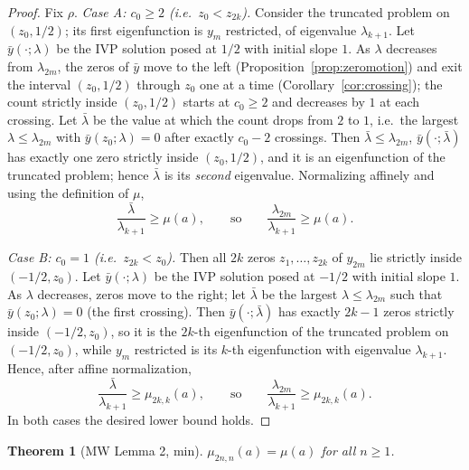 ﻿\documentclass[11pt]{article}
\newtheorem{theorem}{Theorem}[section]
\begin{document}
\begin{proof}
	Fix $\rho$.
	\emph{Case A: $c_0\ge 2$ (i.e.\ $z_0<z_{2k}$).}
	Consider the truncated problem on $(z_0,1/2)$; its first eigenfunction
	is $y_m$ restricted, of eigenvalue $\lambda_{k+1}$.  Let
	$\bar y(\cdot;\lambda)$ be the IVP solution posed at $1/2$ with initial
	slope $1$.  As $\lambda$ decreases from $\lambda_{2m}$, the zeros of
	$\bar y$ move to the left (Proposition~\ref{prop:zeromotion}) and exit
	the interval $(z_0,1/2)$ through $z_0$ one at a time
	(Corollary~\ref{cor:crossing}); the count strictly inside
	$(z_0,1/2)$ starts at $c_0\ge 2$ and decreases by $1$ at each crossing.
	Let $\bar\lambda$ be the value at which the count drops from $2$ to $1$,
	i.e.\ the largest $\lambda\le\lambda_{2m}$ with $\bar y(z_0;\lambda)=0$
	after exactly $c_0-2$ crossings.  Then $\bar\lambda\le\lambda_{2m}$,
	$\bar y(\cdot;\bar\lambda)$ has exactly one zero strictly inside
	$(z_0,1/2)$, and it is an eigenfunction of the truncated problem; hence
	$\bar\lambda$ is its \emph{second} eigenvalue.  Normalizing affinely and
	using the definition of $\mu$,
	\begin{equation*}
		\frac{\bar\lambda}{\lambda_{k+1}}\ge\mu(a),
		\qquad\text{so}\qquad
		\frac{\lambda_{2m}}{\lambda_{k+1}}\ge\mu(a).
	\end{equation*}

	\emph{Case B: $c_0=1$ (i.e.\ $z_{2k}<z_0$).}
	Then all $2k$ zeros $z_1,\ldots,z_{2k}$ of $y_{2m}$ lie strictly inside
	$(-1/2,z_0)$.  Let $\bar y(\cdot;\lambda)$ be the IVP solution posed at
	$-1/2$ with initial slope $1$.  As $\lambda$ decreases, zeros move to
	the right; let $\bar\lambda$ be the largest $\lambda\le\lambda_{2m}$
	such that $\bar y(z_0;\lambda)=0$ (the first crossing).  Then
	$\bar y(\cdot;\bar\lambda)$ has exactly $2k-1$ zeros strictly inside
	$(-1/2,z_0)$, so it is the $2k$-th eigenfunction of the truncated
	problem on $(-1/2,z_0)$, while $y_m$ restricted is its $k$-th
	eigenfunction with eigenvalue $\lambda_{k+1}$.  Hence, after affine
	normalization,
	\begin{equation*}
		\frac{\bar\lambda}{\lambda_{k+1}}\ge\mu_{2k,k}(a),
		\qquad\text{so}\qquad
		\frac{\lambda_{2m}}{\lambda_{k+1}}\ge\mu_{2k,k}(a).
	\end{equation*}
	In both cases the desired lower bound holds.
\end{proof}

\begin{theorem}[MW Lemma 2, min]\label{thm:min}
	$\mu_{2n,n}(a)=\mu(a)$ for all $n\ge 1$.
\end{theorem}
\end{document}
